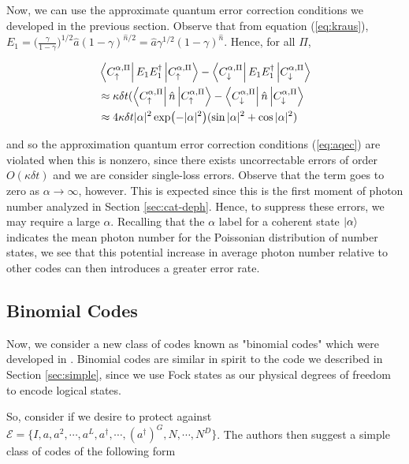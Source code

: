 \documentclass[12]{amsart}
\newcommand\0{\mathbf{0}}
\newcommand\<{\langle}
\renewcommand\>{\rangle}
\begin{document}
Now, we can use the approximate quantum error correction conditions we developed in the previous section. Observe that from equation (\ref{eq:kraus}), $E_1 = \Big(\frac{\gamma}{1-\gamma}\Big)^{1 / 2} \hat{a} (1 - \gamma)^{\hat{n} / 2} = \hat{a} \gamma^{1/2} (1- \gamma)^{\hat{n}}$. Hence, for all $\Pi$,

\begin{align*}
&\bra{C^{\alpha, \Pi}_{\uparrow}}E_1E_1^\dag\ket{C^{\alpha, \Pi}_{\uparrow}} - \bra{C^{\alpha, \Pi}_{\downarrow}}	E_1E_1^\dag\ket{C^{\alpha, \Pi}_{\downarrow}}	\\
&\approx \kappa\delta t (\bra{C^{\alpha, \Pi}_{\uparrow}}\hat{n}\ket{C^{\alpha, \Pi}_{\uparrow}} - \bra{C^{\alpha, \Pi}_{\downarrow}}	\hat{n}\ket{C^{\alpha, \Pi}_{\downarrow}}\\
&\approx 4 \kappa \delta t |\alpha|^2  \exp(-|\alpha|^2)(\sin |\alpha|^2 + \cos|\alpha|^2)
\end{align*}

and so the approximation quantum error correction conditions (\ref{eq:aqec}) are violated when this is nonzero, since there exists uncorrectable errors of order $O(\kappa \delta t)$ and we are consider single-loss errors. Observe that the term goes to zero as $\alpha\rightarrow \infty$, however. This is expected since this is the first moment of photon number analyzed in Section \ref{sec:cat-deph}. Hence, to suppress these errors, we may require a large $\alpha$. Recalling that the $\alpha$ label for a coherent state $\ket{\alpha}$ indicates the mean photon number for the Poissonian distribution of number states, we see that this potential increase in average photon number relative to other codes can then introduces a greater error rate.

\subsection{Binomial Codes}

Now, we consider a new class of codes known as "binomial codes" which were developed in  \cite{michael2016new}. Binomial codes are similar in spirit to the code we described in Section \ref{sec:simple}, since we use Fock states as our physical degrees of freedom to encode logical states.


So, consider if we desire to protect against $\mathcal{E} = \{I, a, a^2, \cdots, a^L, a^\dag, \cdots, (a^\dag)^G, N, \cdots, N^D \}$. The authors then suggest a simple class of codes of the following form
\end{document}
